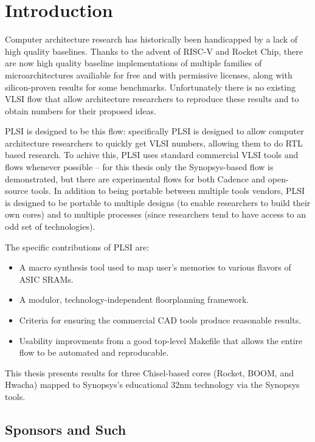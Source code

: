 \documentclass{article}
\begin{document}
\chapter{Introduction}

Computer architecture research has historically been handicapped by a lack of
high quality baselines.  Thanks to the advent of RISC-V and Rocket Chip, there
are now high quality baseline implementations of multiple families of
microarchitectures availiable for free and with permissive licenses, along with
silicon-proven results for some benchmarks.  Unfortunately there is no existing
VLSI flow that allow architecture researchers to reproduce these results and to
obtain numbers for their proposed ideas.

PLSI is designed to be this flow: specifically PLSI is designed to allow
computer architecture researchers to quickly get VLSI numbers, allowing them to
do RTL based research.  To achive this, PLSI uses standard commercial VLSI
tools and flows whenever possible -- for this thesis only the Synopsys-based
flow is demonstrated, but there are experimental flows for both Cadence and
open-source tools.  In addition to being portable between multiple tools
vendors, PLSI is designed to be portable to multiple designs (to enable
researchers to build their own cores) and to multiple processes (since
researchers tend to have access to an odd set of technologies).

The specific contributions of PLSI are:

\begin{itemize}
\item A macro synthesis tool used to map user's memories to various flavors of
ASIC SRAMs.
\item A modulor, technology-independent floorplanning framework.
\item Criteria for ensuring the commercial CAD tools produce reasonable results.
\item Usability improvments from a good top-level Makefile that allows the
entire flow to be automated and reproducable.
\end{itemize}

This thesis presents results for three Chisel-based cores (Rocket, BOOM, and
Hwacha) mapped to Synopsys's educational 32nm technology via the Synopsys
tools.

\section{Sponsors and Such}

\end{document}
